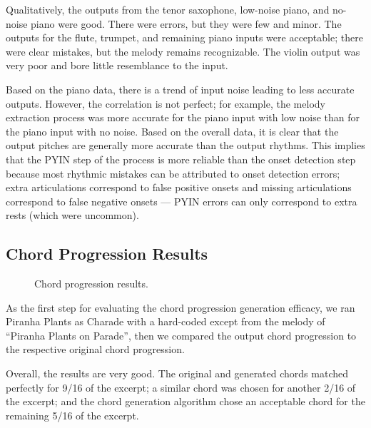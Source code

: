 Qualitatively, the outputs from the tenor saxophone, low-noise piano, and no-noise piano were good. There were errors, but they were few and minor. The outputs for the flute, trumpet, and remaining piano inputs were acceptable; there were clear mistakes, but the melody remains recognizable. The violin output was very poor and bore little resemblance to the input.

Based on the piano data, there is a trend of input noise leading to less accurate outputs. However, the correlation is not perfect; for example, the melody extraction process was more accurate for the piano input with low noise than for the piano input with no noise. Based on the overall data, it is clear that the output pitches are generally more accurate than the output rhythms. This implies that the PYIN step of the process is more reliable than the onset detection step because most rhythmic mistakes can be attributed to onset detection errors; extra articulations correspond to false positive onsets and missing articulations correspond to false negative onsets --- PYIN errors can only correspond to extra rests (which were uncommon).

\subsection{Chord Progression Results}
\label{sec:chord_progression_results}

\begin{figure}
    \resizebox{\linewidth}{!}{}
    \caption{Chord progression results.}
    \label{fig:chord_progression_pie}
\end{figure}
As the first step for evaluating the chord progression generation efficacy, we ran Piranha Plants as Charade with a hard-coded except from the melody of ``Piranha Plants on Parade'', then we compared the output chord progression to the respective original chord progression.

Overall, the results are very good. The original and generated chords matched perfectly for 9/16 of the excerpt; a similar chord was chosen for another 2/16 of the excerpt; and the chord generation algorithm chose an acceptable chord for the remaining 5/16 of the excerpt.


